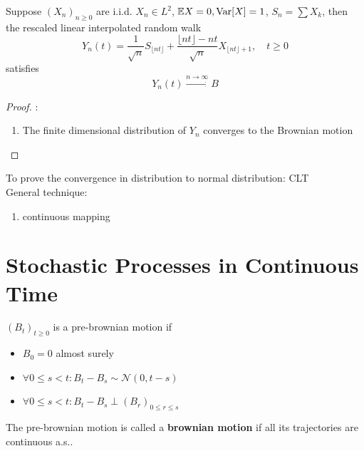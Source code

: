 \begin{theorem}
	Suppose $(X_n)_{n \geq 0}$ are i.i.d. $X_n \in L^2$, $\mathbb{E}X = 0, \operatorname{Var}[X] = 1$, $S_n = \sum X_k$, then the rescaled linear interpolated random walk 
	\begin{equation*}
		Y_n(t) = \frac{1}{\sqrt{n}} S_{\lfloor nt \rfloor} + \frac{\lfloor nt \rfloor - nt}{\sqrt{n}} X_{\lfloor nt \rfloor + 1}, \quad t \geq 0
	\end{equation*}
	satisfies 
	\begin{equation*}
		Y_n(t) \overset{n \rightarrow \infty}{\rightarrow} B
	\end{equation*}
\end{theorem}
\begin{proof}:
	\begin{enumerate}
		\item The finite dimensional distribution of $Y_n$ converges to the Brownian motion
	\end{enumerate}
\end{proof}
\begin{remark}
To prove the convergence in distribution to normal distribution: CLT\\
General technique: 
\begin{enumerate}
	\item continuous mapping
\end{enumerate}
\end{remark}



\newpage
\section{Stochastic Processes in Continuous Time}
\begin{definition}
	$(B_t)_{t \geq 0}$ is a pre-brownian motion if
	\begin{itemize}
		\item $B_0 = 0$ almost surely
		\item $\forall 0 \le s < t: B_t - B_s \sim \mathcal{N}(0, t - s)$
		\item $\forall 0 \le s < t: B_t - B_s \perp (B_r)_{0 \le r \le s}$
	\end{itemize}
	The pre-brownian motion is called a \textbf{brownian motion} if all its trajectories are continuous a.s..
\end{definition}
